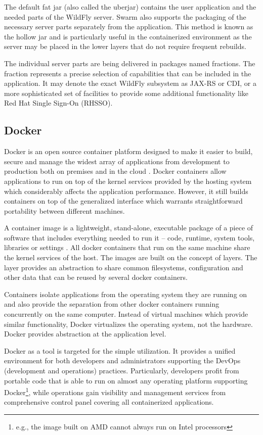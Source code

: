 \documentclass[oneside,
  digital, %
  table,   %
  lof,     %
  lot,     %
]{fithesis3}
\begin{document}
The default fat jar (also called the uberjar) contains the user application and the needed parts of the WildFly server. Swarm also supports the packaging of the necessary server parts separately from the application. This method is known as the hollow jar and is particularly useful in the containerized environment as the server may be placed in the lower layers that do not require frequent rebuilds.

The individual server parts are being delivered in packages named fractions. The fraction represents a precise selection of capabilities that can be included in the application. It may denote the exact WildFly subsystem as JAX-RS or CDI, or a more sophisticated set of facilities to provide some additional functionality like Red Hat Single Sign-On (RHSSO).

\subsection{Docker}
\label{sec:docker}

Docker is an open source container platform designed to make it easier to build, secure and manage the widest array of applications from development to production both on premises and in the cloud \cite{docker}. Docker containers allow applications to run on top of the kernel services provided by the hosting system which considerably affects the application performance. However, it still builds containers on top of the generalized interface which warrants straightforward portability between different machines.

A container image is a lightweight, stand-alone, executable package of a piece of software that includes everything needed to run it -- code, runtime, system tools, libraries or settings \cite{docker}. All docker containers that run on the same machine share the kernel services of the host. The images are built on the concept of layers. The layer provides an abstraction to share common filesystems, configuration and other data that can be reused by several docker containers.

Containers isolate applications from the operating system they are running on and also provide the separation from other docker containers running concurrently on the same computer. Instead of virtual machines which provide similar functionality, Docker virtualizes the operating system, not the hardware. Docker provides abstraction at the application level.

Docker as a tool is targeted for the simple utilization. It provides a unified environment for both developers and administrators supporting the DevOps (development and operations) practices. Particularly, developers profit from portable code that is able to run on almost any operating platform supporting Docker\footnote{e.g., the image built on AMD cannot always run on Intel processors}, while operations gain visibility and management services from comprehensive control panel covering all containerized applications.
\end{document}
